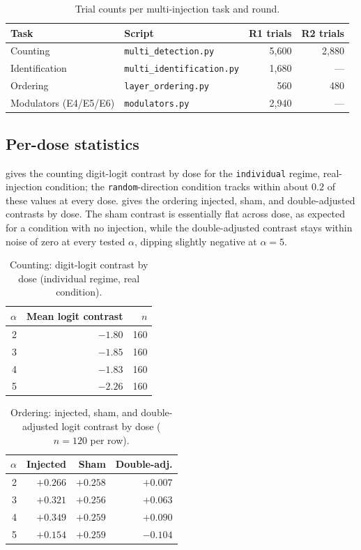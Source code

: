 \begin{table}[h]
\centering
\small
\begin{tabular}{llrr}
\toprule
Task & Script & R1 trials & R2 trials \\
\midrule
Counting & \texttt{multi\_detection.py} & 5{,}600 & 2{,}880 \\
Identification & \texttt{multi\_identification.py} & 1{,}680 & --- \\
Ordering & \texttt{layer\_ordering.py} & 560 & 480 \\
Modulators (E4/E5/E6) & \texttt{modulators.py} & 2{,}940 & --- \\
\bottomrule
\end{tabular}
\caption{Trial counts per multi-injection task and round.}
\label{tab:multi-injection-trials}
\end{table}

\subsection{Per-dose statistics}

 gives the counting digit-logit contrast by dose for the \texttt{individual} regime, real-injection condition; the \texttt{random}-direction condition tracks within about $0.2$ of these values at every dose.
 gives the ordering injected, sham, and double-adjusted contrasts by dose.
The sham contrast is essentially flat across dose, as expected for a condition with no injection, while the double-adjusted contrast stays within noise of zero at every tested $\alpha$, dipping slightly negative at $\alpha{=}5$.

\begin{table}[h]
\centering
\small
\begin{tabular}{rrr}
\toprule
$\alpha$ & Mean logit contrast & $n$ \\
\midrule
2 & $-1.80$ & 160 \\
3 & $-1.85$ & 160 \\
4 & $-1.83$ & 160 \\
5 & $-2.26$ & 160 \\
\bottomrule
\end{tabular}
\caption{Counting: digit-logit contrast by dose (individual regime, real condition).}
\label{tab:app-counting-dose}
\end{table}

\begin{table}[h]
\centering
\small
\begin{tabular}{rrrr}
\toprule
$\alpha$ & Injected & Sham & Double-adj. \\
\midrule
2 & $+0.266$ & $+0.258$ & $+0.007$ \\
3 & $+0.321$ & $+0.256$ & $+0.063$ \\
4 & $+0.349$ & $+0.259$ & $+0.090$ \\
5 & $+0.154$ & $+0.259$ & $-0.104$ \\
\bottomrule
\end{tabular}
\caption{Ordering: injected, sham, and double-adjusted logit contrast by dose ($n=120$ per row).}
\label{tab:app-ordering-dose}
\end{table}

